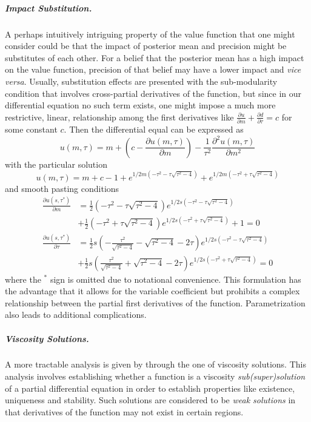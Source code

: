\subparagraph{Impact Substitution. }A perhaps intuitively intriguing property of the value function that one might consider could be that the impact of posterior mean and precision might be substitutes of each other. For a belief that the posterior mean has a high impact on the value function, precision of that belief may have a lower impact and \textit{vice versa}. Usually, substitution effects are presented with the sub-modularity condition that involves cross-partial derivatives of the function, but since in our differential equation no such term exists, one might impose a much more restrictive, linear, relationship among the first derivatives like $\frac{\partial u}{\partial m} + \frac{\partial d}{\partial \tau} = c$ for some constant $c$. Then the differential equal can be expressed as
\[ u(m,\tau) = m + \left( c - \frac{\partial u(m,\tau)}{\partial m} \right) - \frac{1}{\tau^2}\frac{\partial^2u(m,\tau)}{\partial m^2}\]
with the particular solution
\[u(m,\tau) = m + c - 1 +
e^{1/2m\left( -\tau^2 - \tau \sqrt{\tau^2-4}\right)} +       e^{1/2m\left( -\tau^2 + \tau \sqrt{\tau^2-4}\right)}
\]
and smooth pasting conditions
\begin{align*}
\frac{\partial u (s,\tau^*) }{\partial m} 
    &= \frac{1}{2} \left(-\tau^2 - \tau \sqrt{\tau^2 -4}\right) e^{1/2s(-\tau^2 - \tau \sqrt{\tau^2-4})} \\ 
    &+ \frac{1}{2} \left(-\tau^2 + \tau \sqrt{\tau^2 -4}\right) e^{1/2s(-\tau^2 + \tau \sqrt{\tau^2 -4})} +1 = 0 \\
\frac{\partial u (s, \tau^*) }{\partial \tau} 
    &= \frac{1}{2} s \left(-\frac{\tau^2}{\sqrt{\tau^2-4}} - \sqrt{\tau^2-4} - 2\tau\right) e^{1/2s(-\tau^2 - \tau \sqrt{\tau^2-4})} \\ 
    &+ \frac{1}{2} s \left( \frac{\tau^2}{\sqrt{\tau^2-4}} + \sqrt{\tau^2-4} - 2\tau\right) e^{1/2s(-\tau^2 + \tau \sqrt{\tau^2-4})} = 0
\end{align*}
where the $^*$ sign is omitted due to notational convenience. This formulation has the advantage that it allows for the variable coefficient but prohibits a complex relationship between the partial first derivatives of the function. Parametrization also leads to additional complications.

\subparagraph{Viscosity Solutions.}  A more tractable analysis is given by \cite{keller2020undiscounted} through the one of viscosity solutions. This analysis involves establishing whether a function is a viscosity \textit{sub(super)solution} of a partial differential equation in order to establish properties like existence, uniqueness and stability. Such solutions are considered to be \textit{weak solutions} in that derivatives of the function may not exist in certain regions.


